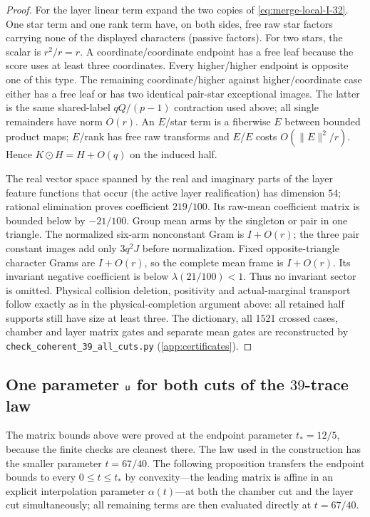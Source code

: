 \begin{proof}
For the layer linear term expand the two copies of \eqref{eq:merge-local-I-32}.
One star term and one rank term have, on both sides, free raw
star factors carrying none of the displayed characters (passive
factors). For two stars, the scalar is $r^2/r=r$.
A coordinate/coordinate endpoint has a free leaf because
the score uses at least three coordinates. Every
higher/higher endpoint is opposite one of this type.
The remaining coordinate/higher against higher/coordinate
case either has a free leaf or has two identical pair-star
exceptional images. The latter is the same shared-label
$qQ/(p-1)$ contraction used above; all single remainders
have norm $O(r)$. An $E$/star term is a fiberwise $E$
between bounded product maps; $E$/rank has free raw
transforms and $E$/$E$ costs $O(\|E\|^2/r)$.
Hence $K\odot H=H+O(q)$ on the induced half.

The real vector space spanned by the real and imaginary parts
of the layer feature functions that occur (the active layer
realification) has dimension $54$; rational
elimination proves coefficient $219/100$. Its raw-mean
coefficient matrix is bounded below by $-21/100$.
Group mean arms by the singleton or pair in one triangle.
The normalized six-arm nonconstant Gram is $I+O(r)$;
the three pair constant images add only $3q^2J$ before
normalization. Fixed opposite-triangle character Grams
are $I+O(r)$, so the complete mean frame is $I+O(r)$.
Its invariant negative coefficient is below
$\lambda(21/100)<1$. Thus no invariant sector is omitted.
Physical collision deletion, positivity and actual-marginal
transport follow exactly as in the physical-completion argument above:
all retained half supports still have size at least three.
The dictionary, all 1521 crossed cases, chamber and layer
matrix gates and separate mean gates are reconstructed by
\texttt{check\_coherent\_39\_all\_cuts.py} (\cref{app:certificates}).
\end{proof}

\subsection{One parameter \texorpdfstring{$\mathsf u$}{u} for both cuts of the \texorpdfstring{$39$}{39}-trace law}

The matrix bounds above were proved at the endpoint parameter
$t_*=12/5$, because the finite checks are cleanest there. The law
used in the construction has the smaller parameter $t=67/40$. The
following proposition transfers the endpoint bounds to every
$0\le t\le t_*$ by convexity---the leading matrix is affine in an
explicit interpolation parameter $\alpha(t)$---at both the
chamber cut and the layer cut simultaneously; all remaining terms
are then evaluated directly at $t=67/40$.

